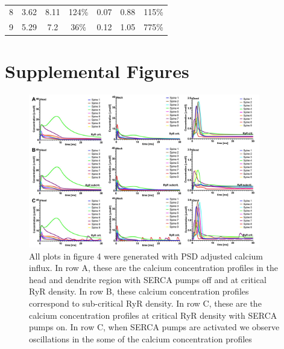 \documentclass[fleqn,10pt]{wlscirep}
\begin{document}
\begin{table}[h!]
\begin{tabular}{|c|c|c|c|c|c|c|}
8                                                             & 3.62                                                                                      & 8.11                                                                                     & 124\%                                                                & 0.07                                                                                          & 0.88                                                                                         & 115\%                                                                    \\
9                                                             & 5.29                                                                                      & 7.2                                                                                      & 36\%                                                                 & 0.12                                                                                          & 1.05                                                                                         & 775\%                                                                   \\ \hline
\end{tabular}
\caption{}
\end{table}

\clearpage
\section*{Supplemental Figures}
\begin{figure}[ht!]
\centering
\includegraphics[width=0.9\textwidth]{images/figure6.jpg}
\caption{{\small All plots in figure 4 were generated with PSD adjusted calcium influx. In row A, these are the calcium concentration profiles in the head and dendrite region with SERCA pumps off and at critical RyR density. In row B, these calcium concentration profiles correspond to sub-critical RyR density. In row C, these are the calcium concentration profiles at critical RyR density with SERCA pumps on. In row C, when SERCA pumps are activated we observe oscillations in the some of the calcium concentration profiles}}
\end{figure}
\end{document}
